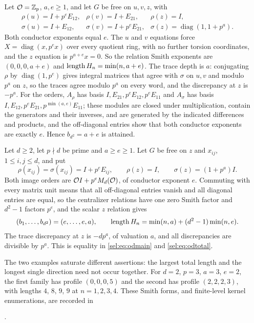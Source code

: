 \begin{example}\label{sel:ex:odexponent}
Let $\mathcal{O}=\mathbb{Z}_p$, $a,e\ge1$, and let $G$ be free on $u,v,z$, with
\[
\begin{array}{lll}
 \rho(u)=I+p^eE_{12},&\rho(v)=I+E_{21},&\rho(z)=I,\\
 \sigma(u)=I+E_{12},&\sigma(v)=I+p^eE_{21},&
 \sigma(z)=\operatorname{diag}(1,1+p^a).
\end{array}
\]
Both conductor exponents equal $e$. The $u$ and $v$ equations force
$X=\operatorname{diag}(x,p^ex)$ over every quotient ring, with no further
torsion coordinates, and the $z$ equation is $p^{a+e}x=0$. So the relation
Smith exponents are $(0,0,0,a+e)$ and $\operatorname{length} H_n=\min(n,a+e)$. The trace
depth is $a$: conjugating $\rho$ by $\operatorname{diag}(1,p^e)$ gives
integral matrices that agree with $\sigma$ on $u,v$ and modulo $p^a$ on
$z$, so the traces agree modulo $p^a$ on every word, and the discrepancy at
$z$ is $-p^a$. For the orders, $A_\rho$ has basis
$I,E_{21},p^eE_{12},p^eE_{11}$ and $A_\sigma$ has basis
$I,E_{12},p^eE_{21},p^{\min(a,e)}E_{11}$; these modules are closed under
multiplication, contain the generators and their inverses, and are
generated by the indicated differences and products, and the off-diagonal
entries show that both conductor exponents are exactly $e$. Hence
$b_{d^2}=a+e$ is attained.
\end{example}

\begin{example}\label{sel:ex:odlength}
Let $d\ge2$, let $p\nmid d$ be prime and $a\ge e\ge1$. Let $G$ be free on $z$
and $x_{ij}$, $1\le i,j\le d$, and put
\[
 \rho(x_{ij})=\sigma(x_{ij})=I+p^eE_{ij},\qquad\rho(z)=I,\qquad\sigma(z)=(1+p^a)I .
\]
Both image orders are $\mathcal{O} I+p^eM_d(\mathcal{O})$, of conductor exponent $e$.
Commuting with every matrix unit means that all off-diagonal entries vanish
and all diagonal entries are equal, so the centralizer relations have one
zero Smith factor and $d^2-1$ factors $p^e$, and the scalar $z$ relation
gives
\[
 (b_1,\dots,b_{d^2})=(e,\dots,e,a),\qquad
 \operatorname{length} H_n=\min(n,a)+(d^2-1)\min(n,e).
\]
The trace discrepancy at $z$ is $-dp^a$, of valuation $a$, and all
discrepancies are divisible by $p^a$. This is equality in
\eqref{sel:eq:odmain} and \eqref{sel:eq:odtotal}.
\end{example}

The two examples saturate different assertions: the largest total length and
the longest single direction need not occur together. For $d=2$, $p=3$,
$a=3$, $e=2$, the first family has profile $(0,0,0,5)$ and the second has
profile $(2,2,2,3)$, with lengths $4$, $8$, $9$, $9$ at $n=1,2,3,4$. These Smith forms,
and finite-level kernel enumerations, are recorded in
\begin{center}
.
\end{center}

